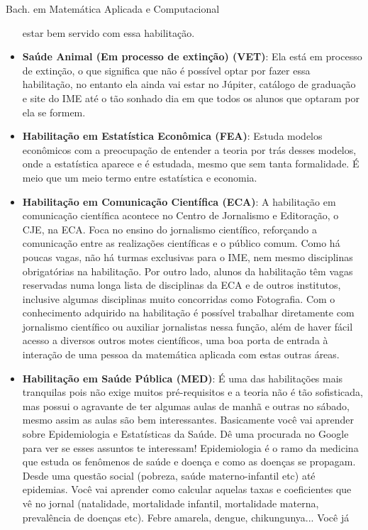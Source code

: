 \begin{subsecao}{Bach. em Matemática Aplicada e Computacional}
\begin{itemize}
    estar bem servido com essa habilitação.
  \item \textbf{Saúde Animal (Em processo de extinção) (VET)}: Ela está em
    processo de extinção, o que significa que não é possível optar por fazer
    essa habilitação, no entanto ela ainda vai estar no Júpiter, catálogo de
    graduação e site do IME até o tão sonhado dia em que todos os alunos que
    optaram por ela se formem.
  \item \textbf{Habilitação em Estatística Econômica (FEA)}: Estuda modelos
    econômicos com a preocupação de entender a teoria por trás desses modelos,
    onde a estatística aparece e é estudada, mesmo que sem tanta formalidade. É
    meio que um meio termo entre estatística e economia.
  \item \textbf{Habilitação em Comunicação Científica (ECA)}: A habilitação em
    comunicação científica acontece no Centro de Jornalismo e Editoração, o CJE,
    na ECA. Foca no ensino do jornalismo científico, reforçando a comunicação
    entre as realizações científicas e o público comum. Como há poucas vagas,
    não há turmas exclusivas para o IME, nem mesmo disciplinas obrigatórias na
    habilitação. Por outro lado, alunos da habilitação têm vagas reservadas numa
    longa lista de disciplinas da ECA e de outros institutos, inclusive algumas
    disciplinas muito concorridas como Fotografia. Com o conhecimento adquirido
    na habilitação é possível trabalhar diretamente com jornalismo científico ou
    auxiliar jornalistas nessa função, além de haver fácil acesso a diversos
    outros motes científicos, uma boa porta de entrada à interação de uma pessoa
    da matemática aplicada com estas outras áreas.
  \item \textbf{Habilitação em Saúde Pública (MED)}: É uma das habilitações mais
    tranquilas pois não exige muitos pré-requisitos e a teoria não é tão
    sofisticada, mas possui o agravante de ter algumas aulas de manhã e outras
    no sábado, mesmo assim as aulas são bem interessantes. Basicamente você vai
    aprender sobre Epidemiologia e Estatísticas da Saúde. Dê uma procurada no
    Google para ver se esses assuntos te interessam! Epidemiologia é o ramo da
    medicina que estuda os fenômenos de saúde e doença e como as doenças se
    propagam. Desde uma questão social (pobreza, saúde materno-infantil etc)
    até epidemias. Você vai aprender como calcular aquelas taxas e coeficientes
    que vê no jornal (natalidade, mortalidade infantil, mortalidade materna,
    prevalência de doenças etc). Febre amarela, dengue, chikungunya... Você já

\end{itemize}
\end{subsecao}

